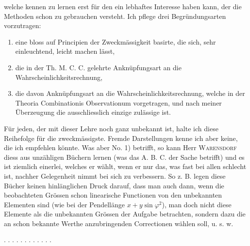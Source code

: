 welche kennen zu lernen erst für den ein lebhaftes Interesse haben kann, der
die Methoden schon zu gebrauchen versteht. Ich pflege drei Begründungsarten
vorzutragen:

\begin{enumerate}
\item[1)] eine bloss auf Principien der Zweckmässigkeit basirte, die sich, sehr
einleuchtend, leicht machen lässt,
\item[2)] die in der Th. M. C. C. gelehrte Anknüpfungsart an die
Wahrscheinlichkeitsrechnung,
\item[3)] die davon  Anknüpfungsart an die
Wahrscheinlichkeitsrechnung, welche in der Theoria Combinationis
Observationum vorgetragen, und nach meiner Überzeugung die ausschliesslich
einzige zulässige ist.
\end{enumerate}

Für jeden, der mit dieser Lehre noch ganz unbekannt ist, halte ich diese
Reihefolge für die zweckmässigste. Fremde Darstellungen kenne ich aber
keine, die ich empfehlen könnte. Was aber No. 1) betrifft, so kann Herr
\textsc{Warensdorf} diess aus unzähligen Büchern lernen (was das A. B. C. der Sache
betrifft) und es ist ziemlich einerlei, welches er wählt, wenn er nur das,
was fast bei allen schlecht ist, nachher Gelegenheit nimmt bei sich zu
verbessern. So z. B. legen diese Bücher keinen hinlänglichen Druck darauf,
dass man auch dann, wenn die beobachteten Grössen schon linearische
Functionen von den unbekannten Elementen sind (wie bei der Pendellänge
$x+y\sin\varphi^2$), man doch nicht diese Elemente als die unbekannten
Grössen der Aufgabe betrachten, sondern dazu die an schon bekannte
 Werthe anzubringenden Correctionen wählen soll, u. s. w.

. . . . . . . . . . . .
